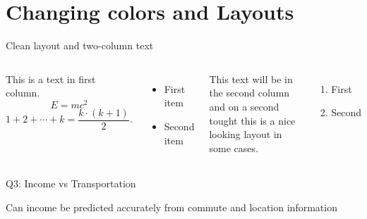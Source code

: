 \documentclass[aspectratio=169,t,xcolor=table]{beamer}
\begin{document}
\section{Changing colors and Layouts}


\begin{frame}{Clean layout and two-column text}
    
    \begin{columns}
    
        This is a text in first column.
        $$E=mc^2$$
        $$ 1 + 2 + \cdots + k =  \frac{k \cdot (k + 1)}{2}.$$
        \begin{itemize}
        \item First item
       
        \item Second item
        \end{itemize}
        
        This text will be in the second column
        and on a second tought this is a nice looking
        layout in some cases.
        
        \begin{enumerate}
            \item First
            \item Second
        \end{enumerate}
        
    \end{columns}
    
\end{frame}


\begin{frame}{Q3: Income vs Transportation}
    
     Can income be predicted accurately from commute and location information
     
    \begin{columns}
    
        
        
       
        
    \end{columns}
    
\end{frame}
\end{document}
